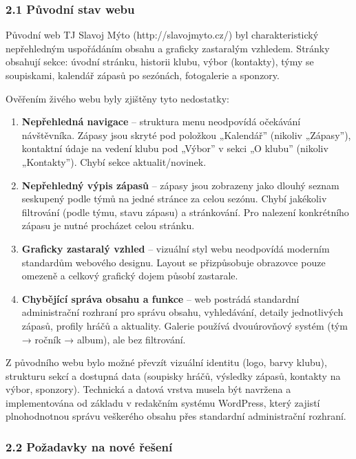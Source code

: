\subsubsection{2.1 Původní stav webu}\label{pux16fvodnuxed-stav-webu}

Původní web TJ Slavoj Mýto (http://slavojmyto.cz/) byl charakteristický
nepřehledným uspořádáním obsahu a graficky zastaralým vzhledem. Stránky
obsahují sekce: úvodní stránku, historii klubu, výbor (kontakty), týmy
se soupiskami, kalendář zápasů po sezónách, fotogalerie a sponzory.

Ověřením živého webu byly zjištěny tyto nedostatky:

\begin{enumerate}
\def\labelenumi{\arabic{enumi}.}
\item
  \textbf{Nepřehledná navigace} -- struktura menu neodpovídá očekávání
  návštěvníka. Zápasy jsou skryté pod položkou „Kalendář'' (nikoliv
  „Zápasy''), kontaktní údaje na vedení klubu pod „Výbor'' v sekci „O
  klubu'' (nikoliv „Kontakty''). Chybí sekce aktualit/novinek.
\item
  \textbf{Nepřehledný výpis zápasů} -- zápasy jsou zobrazeny jako dlouhý
  seznam seskupený podle týmů na jedné stránce za celou sezónu. Chybí
  jakékoliv filtrování (podle týmu, stavu zápasu) a stránkování. Pro
  nalezení konkrétního zápasu je nutné procházet celou stránku.
\item
  \textbf{Graficky zastaralý vzhled} -- vizuální styl webu neodpovídá
  moderním standardům webového designu. Layout se přizpůsobuje obrazovce
  pouze omezeně a celkový grafický dojem působí zastarale.
\item
  \textbf{Chybějící správa obsahu a funkce} -- web postrádá standardní
  administrační rozhraní pro správu obsahu, vyhledávání, detaily
  jednotlivých zápasů, profily hráčů a aktuality. Galerie používá
  dvouúrovňový systém (tým → ročník → album), ale bez filtrování.
\end{enumerate}

Z původního webu bylo možné převzít vizuální identitu (logo, barvy
klubu), strukturu sekcí a dostupná data (soupisky hráčů, výsledky
zápasů, kontakty na výbor, sponzory). Technická a datová vrstva musela
být navržena a implementována od základu v redakčním systému WordPress,
který zajistí plnohodnotnou správu veškerého obsahu přes standardní
administrační rozhraní.

\subsubsection{2.2 Požadavky na nové
řešení}\label{poux17eadavky-na-novuxe9-ux159eux161enuxed}

